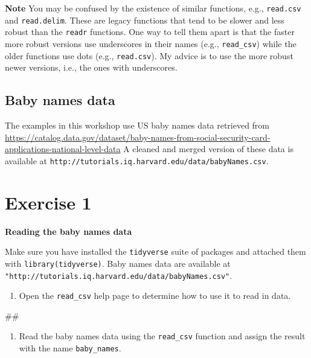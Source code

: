 \documentclass[]{book}
\newenvironment{Shaded}{\begin{snugshade}}{\end{snugshade}}
\newcommand{\NormalTok}[1]{#1}
\providecommand{\tightlist}{%
  \setlength{\itemsep}{0pt}\setlength{\parskip}{0pt}}
\begin{document}
\textbf{Note} You may be confused by the existence of similar functions,
e.g., \texttt{read.csv} and \texttt{read.delim}. These are legacy
functions that tend to be slower and less robust than the \texttt{readr}
functions. One way to tell them apart is that the faster more robust
versions use underscores in their names (e.g., \texttt{read\_csv}) while
the older functions use dots (e.g., \texttt{read.csv}). My advice is to
use the more robust newer versions, i.e., the ones with underscores.

\subsection{Baby names data}\label{baby-names-data}

The examples in this workshop use US baby names data retrieved from
\url{https://catalog.data.gov/dataset/baby-names-from-social-security-card-applications-national-level-data}
A cleaned and merged version of these data is available at
\texttt{http://tutorials.iq.harvard.edu/data/babyNames.csv}.

\section{Exercise 1}\label{exercise-1}

\textbf{Reading the baby names data}

Make sure you have installed the \texttt{tidyverse} suite of packages
and attached them with \texttt{library(tidyverse)}. Baby names data are
available at
\texttt{"http://tutorials.iq.harvard.edu/data/babyNames.csv"}.

\begin{enumerate}
\def\labelenumi{\arabic{enumi}.}
\tightlist
\item
  Open the \texttt{read\_csv} help page to determine how to use it to
  read in data.
\end{enumerate}

\begin{Shaded}
\begin{Highlighting}[]
\NormalTok{##}
\end{Highlighting}
\end{Shaded}

\begin{enumerate}
\def\labelenumi{\arabic{enumi}.}
\setcounter{enumi}{1}
\tightlist
\item
  Read the baby names data using the \texttt{read\_csv} function and
  assign the result with the name \texttt{baby\_names}.
\end{enumerate}
\end{document}

